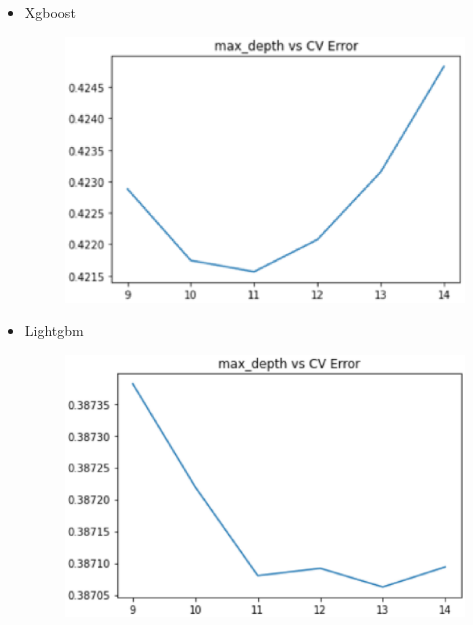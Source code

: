 \documentclass[
 size=14pt,
 paper=smartboard,  %
 mode=present, 		%
 display=slides, 	%
 style=tuliplab,  	%
 pauseslide,
 fleqn,leqno]{powerdot}
\begin{document}
\begin{slide}[toc=,bm=]{}
  \begin{itemize}
    \item Xgboost
    \begin{figure}\includegraphics[scale=0.3]{figures/20.eps}\end{figure}
    \item Lightgbm
    \begin{figure}\includegraphics[scale=0.3]{figures/24.eps}\end{figure}
  \end{itemize}
\end{slide}


\end{document}
